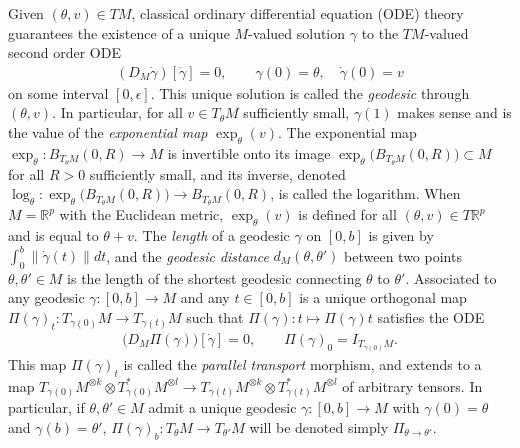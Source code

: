\documentclass{article}
\newcommand{\RB}{\mathbb{R}}
\theoremstyle{plain}
\theoremstyle{definition}
\theoremstyle{remark}
\begin{document}
Given $(\theta,v)\in TM$, classical ordinary differential equation (ODE) theory guarantees the existence of a unique $M$-valued solution $\gamma$ to the $TM$-valued second order ODE
\begin{align}
    (D_M\dot{\gamma})[\dot{\gamma}] = 0,\qquad \gamma(0) = \theta,\quad \dot{\gamma}(0) = v\label{eq:geodesicequation}
\end{align}
on some interval $[0,\epsilon]$. This unique solution is called the \emph{geodesic} through $(\theta,v)$. In particular, for all $v\in T_{\theta}M$ sufficiently small, $\gamma(1)$ makes sense and is the value of the \emph{exponential map} $\exp_{\theta}(v)$. The exponential map $\exp_{\theta}:B_{T_{\theta}M}(0,R)\rightarrow M$ is invertible onto its image $\exp_{\theta}\big(B_{T_{\theta}M}(0,R)\big)\subset M$ for all $R>0$ sufficiently small, and its inverse, denoted $\log_{\theta}:\exp_{\theta}\big(B_{T_{\theta}M}(0,R)\big)\rightarrow B_{T_{\theta}M}(0,R)$, is called the logarithm. When $M = \RB^p$ with the Euclidean metric, $\exp_{\theta}(v)$ is defined for all $(\theta,v)\in T\RB^p$ and is equal to $\theta+v$. The \emph{length} of a geodesic $\gamma$ on $[0,b]$ is given by $\int_0^b\|\dot{\gamma}(t)\|dt$, and the \emph{geodesic distance} $d_M(\theta,\theta')$ between two points $\theta,\theta'\in M$ is the length of the shortest geodesic connecting $\theta$ to $\theta'$. Associated to any geodesic $\gamma:[0,b]\rightarrow M$ and any $t\in [0,b]$ is a unique orthogonal map $\Pi(\gamma)_t:T_{\gamma(0)}M\rightarrow T_{\gamma(t)}M$ such that $\Pi(\gamma):t\mapsto \Pi(\gamma)t$ satisfies the ODE
\begin{align}
    \big(D_M\Pi(\gamma)\big)[\dot{\gamma}] = 0,\qquad \Pi(\gamma)_0 = I_{T_{\gamma(0)}M}.
\end{align}
This map $\Pi(\gamma)_t$ is called the \emph{parallel transport} morphism, and extends to a map $T_{\gamma(0)}M^{\otimes k}\otimes T_{\gamma(0)}^*M^{\otimes l}\rightarrow T_{\gamma(t)}M^{\otimes k}\otimes T_{\gamma(t)}^*M^{\otimes l}$ of arbitrary tensors. In particular, if $\theta,\theta'\in M$ admit a unique geodesic $\gamma:[0,b]\rightarrow M$ with $\gamma(0) = \theta$ and $\gamma(b) = \theta'$, $\Pi(\gamma)_b:T_{\theta}M\rightarrow T_{\theta'}M$ will be denoted simply $\Pi_{\theta\rightarrow\theta'}$.
\end{document}
